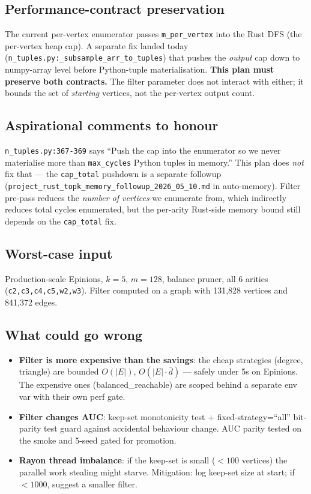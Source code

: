 \documentclass[11pt,a4paper]{article}
\begin{document}
\subsection*{Performance-contract preservation}
The current per-vertex enumerator passes \texttt{m\_per\_vertex} into the
Rust DFS (the per-vertex heap cap).  A separate fix landed today
(\texttt{n\_tuples.py:\_subsample\_arr\_to\_tuples}) that pushes the
\emph{output} cap down to numpy-array level before Python-tuple
materialisation. \textbf{This plan must preserve both contracts.}  The
filter parameter does not interact with either; it bounds the set of
\emph{starting} vertices, not the per-vertex output count.

\subsection*{Aspirational comments to honour}
\texttt{n\_tuples.py:367-369} says ``Push the cap into the enumerator so
we never materialise more than \texttt{max\_cycles} Python tuples in
memory.''  This plan does \emph{not} fix that --- the
\texttt{cap\_total} pushdown is a separate followup
(\texttt{project\_rust\_topk\_memory\_followup\_2026\_05\_10.md} in
auto-memory).  Filter pre-pass reduces the \emph{number of vertices} we
enumerate from, which indirectly reduces total cycles enumerated, but
the per-arity Rust-side memory bound still depends on the
\texttt{cap\_total} fix.

\subsection*{Worst-case input}
Production-scale Epinions, $k{=}5$, $m{=}128$, balance pruner,
all 6 arities (\texttt{c2,c3,c4,c5,w2,w3}).  Filter computed on a
graph with 131{,}828 vertices and 841{,}372 edges.

\subsection*{What could go wrong}
\begin{itemize}
\item \textbf{Filter is more expensive than the savings}: the cheap
  strategies (degree, triangle) are bounded $O(|E|)$, $O(|E|\cdot\overline{d})$
  --- safely under 5s on Epinions.  The expensive ones
  (balanced\_reachable) are scoped behind a separate env var with their
  own perf gate.
\item \textbf{Filter changes AUC}: keep-set monotonicity test +
  fixed-strategy=``all'' bit-parity test guard against accidental
  behaviour change.  AUC parity tested on the smoke and 5-seed gated for
  promotion.
\item \textbf{Rayon thread imbalance}: if the keep-set is small
  ($<100$ vertices) the parallel work stealing might starve.  Mitigation:
  log keep-set size at start; if $<1000$, suggest a smaller filter.
\end{itemize}
\end{document}
